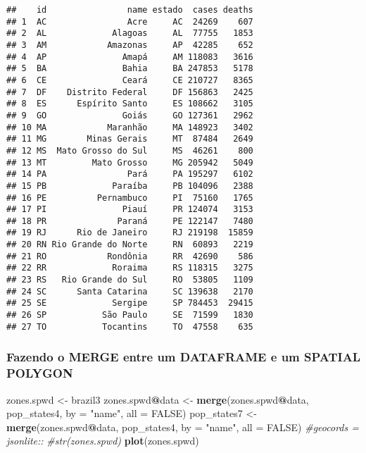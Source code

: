 \documentclass[
]{article}
\newenvironment{Shaded}{\begin{snugshade}}{\end{snugshade}}
\newcommand{\CommentTok}[1]{\textcolor[rgb]{0.56,0.35,0.01}{\textit{#1}}}
\newcommand{\DataTypeTok}[1]{\textcolor[rgb]{0.13,0.29,0.53}{#1}}
\newcommand{\KeywordTok}[1]{\textcolor[rgb]{0.13,0.29,0.53}{\textbf{#1}}}
\newcommand{\NormalTok}[1]{#1}
\newcommand{\OperatorTok}[1]{\textcolor[rgb]{0.81,0.36,0.00}{\textbf{#1}}}
\newcommand{\OtherTok}[1]{\textcolor[rgb]{0.56,0.35,0.01}{#1}}
\newcommand{\StringTok}[1]{\textcolor[rgb]{0.31,0.60,0.02}{#1}}
\begin{document}
\begin{verbatim}
##    id                name estado  cases deaths
## 1  AC                Acre     AC  24269    607
## 2  AL             Alagoas     AL  77755   1853
## 3  AM            Amazonas     AP  42285    652
## 4  AP               Amapá     AM 118083   3616
## 5  BA               Bahia     BA 247853   5178
## 6  CE               Ceará     CE 210727   8365
## 7  DF    Distrito Federal     DF 156863   2425
## 8  ES      Espírito Santo     ES 108662   3105
## 9  GO               Goiás     GO 127361   2962
## 10 MA            Maranhão     MA 148923   3402
## 11 MG        Minas Gerais     MT  87484   2649
## 12 MS  Mato Grosso do Sul     MS  46261    800
## 13 MT         Mato Grosso     MG 205942   5049
## 14 PA                Pará     PA 195297   6102
## 15 PB             Paraíba     PB 104096   2388
## 16 PE          Pernambuco     PI  75160   1765
## 17 PI               Piauí     PR 124074   3153
## 18 PR              Paraná     PE 122147   7480
## 19 RJ      Rio de Janeiro     RJ 219198  15859
## 20 RN Rio Grande do Norte     RN  60893   2219
## 21 RO            Rondônia     RR  42690    586
## 22 RR             Roraima     RS 118315   3275
## 23 RS   Rio Grande do Sul     RO  53805   1109
## 24 SC      Santa Catarina     SC 139638   2170
## 25 SE             Sergipe     SP 784453  29415
## 26 SP           São Paulo     SE  71599   1830
## 27 TO           Tocantins     TO  47558    635
\end{verbatim}

\hypertarget{fazendo-o-merge-entre-um-dataframe-e-um-spatial-polygon}{%
\subsubsection{Fazendo o MERGE entre um DATAFRAME e um SPATIAL
POLYGON}\label{fazendo-o-merge-entre-um-dataframe-e-um-spatial-polygon}}

\begin{Shaded}
\begin{Highlighting}[]
\NormalTok{zones.spwd \textless{}{-}}\StringTok{ }\NormalTok{brazil3}
\NormalTok{zones.spwd}\OperatorTok{@}\NormalTok{data \textless{}{-}}\StringTok{ }\KeywordTok{merge}\NormalTok{(zones.spwd}\OperatorTok{@}\NormalTok{data, pop\_states4, }\DataTypeTok{by =} \StringTok{"name"}\NormalTok{,  }\DataTypeTok{all =} \OtherTok{FALSE}\NormalTok{)}
\NormalTok{pop\_states7 \textless{}{-}}\StringTok{ }\KeywordTok{merge}\NormalTok{(zones.spwd}\OperatorTok{@}\NormalTok{data, pop\_states4, }\DataTypeTok{by =} \StringTok{"name"}\NormalTok{,  }\DataTypeTok{all =} \OtherTok{FALSE}\NormalTok{)}
\CommentTok{\#geocords = jsonlite::}
\CommentTok{\#str(zones.spwd)}
\KeywordTok{plot}\NormalTok{(zones.spwd)}
\end{Highlighting}
\end{Shaded}
\end{document}

